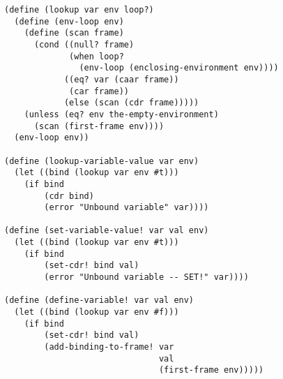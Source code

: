 \documentclass[a4paper,12pt]{article}
\begin{document}
\begin{lstlisting}
(define (lookup var env loop?)
  (define (env-loop env)
    (define (scan frame)
      (cond ((null? frame)
             (when loop?
               (env-loop (enclosing-environment env))))
            ((eq? var (caar frame))
             (car frame))
            (else (scan (cdr frame)))))
    (unless (eq? env the-empty-environment)
      (scan (first-frame env))))
  (env-loop env))

(define (lookup-variable-value var env)
  (let ((bind (lookup var env #t)))
    (if bind
        (cdr bind)
        (error "Unbound variable" var))))

(define (set-variable-value! var val env)
  (let ((bind (lookup var env #t)))
    (if bind
        (set-cdr! bind val)
        (error "Unbound variable -- SET!" var))))

(define (define-variable! var val env)
  (let ((bind (lookup var env #f)))
    (if bind
        (set-cdr! bind val)
        (add-binding-to-frame! var
                               val
                               (first-frame env)))))
\end{lstlisting}
\end{document}
